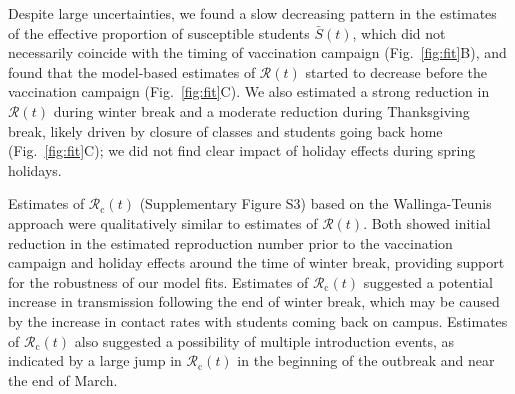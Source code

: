 \documentclass[12pt]{article}
\newcommand{\fref}[1]{Fig.~\ref{fig:#1}}
\begin{document}
Despite large uncertainties, we found a slow decreasing pattern in the estimates of the effective proportion of susceptible students $\bar{S}(t)$, which did not necessarily coincide with the timing of vaccination campaign (\fref{fit}B), and found that the model-based estimates of $\mathcal{R}(t)$ started to decrease before the vaccination campaign (\fref{fit}C).
We also estimated a strong reduction in $\mathcal{R}(t)$ during winter break and a moderate reduction during Thanksgiving break, likely driven by closure of classes and students going back home (\fref{fit}C);
we did not find clear impact of holiday effects during spring holidays.

Estimates of $\mathcal{R}_{\mathrm c}(t)$ (Supplementary Figure S3) based on the Wallinga-Teunis approach were qualitatively similar to estimates of $\mathcal{R}(t)$.
Both showed initial reduction in the estimated reproduction number prior to the vaccination campaign and holiday effects around the time of winter break, providing support for the robustness of our model fits.
Estimates of $\mathcal{R}_{\mathrm c}(t)$ suggested a potential increase in transmission following the end of winter break, which may be caused by the increase in contact rates with students coming back on campus.
Estimates of $\mathcal{R}_{\mathrm c}(t)$ also suggested a possibility of multiple introduction events, as indicated by a large jump in $\mathcal{R}_{\mathrm c}(t)$ in the beginning of the outbreak and near the end of March.
\end{document}

